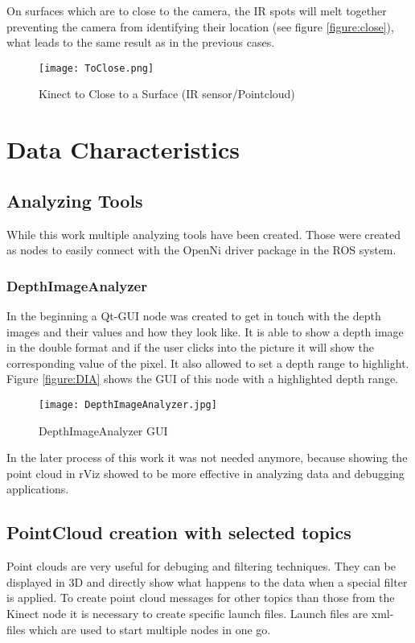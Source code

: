 On surfaces which are to close to the camera, the IR spots will melt together preventing the camera from
identifying their location (see figure \vref{figure:close}), what leads to the same result as in the previous cases.
\begin{figure}[htp]
\begin{center}
  \texttt{[image: ToClose.png]} 
  \caption{Kinect to Close to a Surface (IR sensor/Pointcloud)}
  \label{figure:close}
\end{center}
\end{figure}
\clearpage

\section{Data Characteristics} 
 
\subsection{Analyzing Tools}

While this work multiple analyzing tools have been created. Those were created as
nodes to easily connect with the OpenNi driver package in the ROS system.

\subsubsection{DepthImageAnalyzer}
In the beginning a Qt-GUI node was created to get in touch with the depth images and 
their values and how they look like. It is able to show a depth image in the double
format and if the user clicks into the picture it will show the corresponding 
value of the pixel. It also allowed to set a depth range to highlight. 
Figure \vref{figure:DIA} shows the GUI of this node with a highlighted depth range.

\begin{figure}[h!tp]
\begin{center}
  \texttt{[image: DepthImageAnalyzer.jpg]}
  \caption{DepthImageAnalyzer GUI}
  \label{figure:DIA}
\end{center}
\end{figure}
\clearpage 


In the later process of this work it was not needed anymore, because showing the point cloud
in rViz showed to be more effective in analyzing data and debugging applications.

\subsection{PointCloud creation with selected topics}
Point clouds are very useful for debuging and filtering techniques. They can be displayed in
3D and directly show what happens to the data when a special filter is applied.
To create point cloud messages for other topics than those from the Kinect node it is necessary to
create specific launch files. Launch files are xml-files which are used to start multiple nodes in one
go. 


